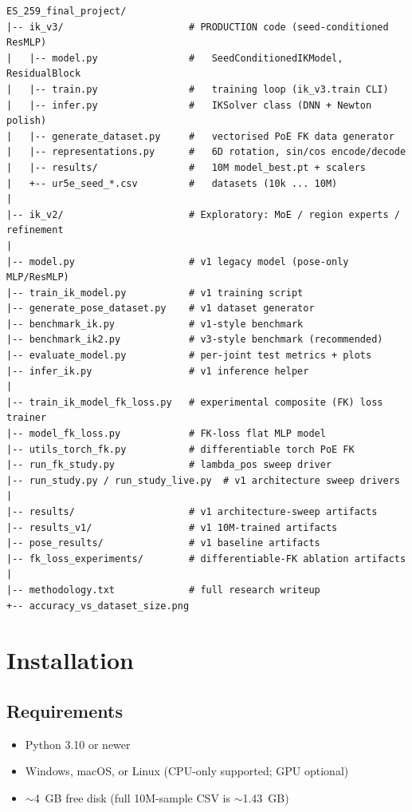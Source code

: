 \documentclass[11pt]{article}
\begin{document}
\begin{lstlisting}[style=shell]
ES_259_final_project/
|-- ik_v3/                      # PRODUCTION code (seed-conditioned ResMLP)
|   |-- model.py                #   SeedConditionedIKModel, ResidualBlock
|   |-- train.py                #   training loop (ik_v3.train CLI)
|   |-- infer.py                #   IKSolver class (DNN + Newton polish)
|   |-- generate_dataset.py     #   vectorised PoE FK data generator
|   |-- representations.py      #   6D rotation, sin/cos encode/decode
|   |-- results/                #   10M model_best.pt + scalers
|   +-- ur5e_seed_*.csv         #   datasets (10k ... 10M)
|
|-- ik_v2/                      # Exploratory: MoE / region experts / refinement
|
|-- model.py                    # v1 legacy model (pose-only MLP/ResMLP)
|-- train_ik_model.py           # v1 training script
|-- generate_pose_dataset.py    # v1 dataset generator
|-- benchmark_ik.py             # v1-style benchmark
|-- benchmark_ik2.py            # v3-style benchmark (recommended)
|-- evaluate_model.py           # per-joint test metrics + plots
|-- infer_ik.py                 # v1 inference helper
|
|-- train_ik_model_fk_loss.py   # experimental composite (FK) loss trainer
|-- model_fk_loss.py            # FK-loss flat MLP model
|-- utils_torch_fk.py           # differentiable torch PoE FK
|-- run_fk_study.py             # lambda_pos sweep driver
|-- run_study.py / run_study_live.py  # v1 architecture sweep drivers
|
|-- results/                    # v1 architecture-sweep artifacts
|-- results_v1/                 # v1 10M-trained artifacts
|-- pose_results/               # v1 baseline artifacts
|-- fk_loss_experiments/        # differentiable-FK ablation artifacts
|
|-- methodology.txt             # full research writeup
+-- accuracy_vs_dataset_size.png
\end{lstlisting}

\section{Installation}

\subsection{Requirements}
\begin{itemize}[leftmargin=*]
    \item Python 3.10 or newer
    \item Windows, macOS, or Linux (CPU-only supported; GPU optional)
    \item $\sim$4~GB free disk (full 10M-sample CSV is $\sim$1.43~GB)
\end{itemize}
\end{document}
